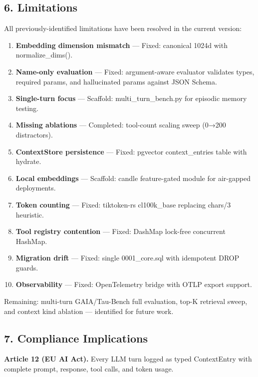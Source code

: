 \documentclass[
  10pt,
]{article}
\providecommand{\tightlist}{%
  \setlength{\itemsep}{0pt}\setlength{\parskip}{0pt}}
\begin{document}
\subsection{6. Limitations}\label{limitations}

All previously-identified limitations have been resolved in the current
version:

\begin{enumerate}
\def\labelenumi{\arabic{enumi}.}
\tightlist
\item
  \textbf{Embedding dimension mismatch} --- Fixed: canonical 1024d with
  normalize\_dims().
\item
  \textbf{Name-only evaluation} --- Fixed: argument-aware evaluator
  validates types, required params, and hallucinated params against JSON
  Schema.
\item
  \textbf{Single-turn focus} --- Scaffold: multi\_turn\_bench.py for
  episodic memory testing.
\item
  \textbf{Missing ablations} --- Completed: tool-count scaling sweep
  (0→200 distractors).
\item
  \textbf{ContextStore persistence} --- Fixed: pgvector context\_entries
  table with hydrate.
\item
  \textbf{Local embeddings} --- Scaffold: candle feature-gated module
  for air-gapped deployments.
\item
  \textbf{Token counting} --- Fixed: tiktoken-rs cl100k\_base replacing
  chars/3 heuristic.
\item
  \textbf{Tool registry contention} --- Fixed: DashMap lock-free
  concurrent HashMap.
\item
  \textbf{Migration drift} --- Fixed: single 0001\_core.sql with
  idempotent DROP guards.
\item
  \textbf{Observability} --- Fixed: OpenTelemetry bridge with OTLP
  export support.
\end{enumerate}

Remaining: multi-turn GAIA/Tau-Bench full evaluation, top-K retrieval
sweep, and context kind ablation --- identified for future work.

\subsection{7. Compliance Implications}\label{compliance-implications}

\textbf{Article 12 (EU AI Act).} Every LLM turn logged as typed
ContextEntry with complete prompt, response, tool calls, and token
usage.
\end{document}
